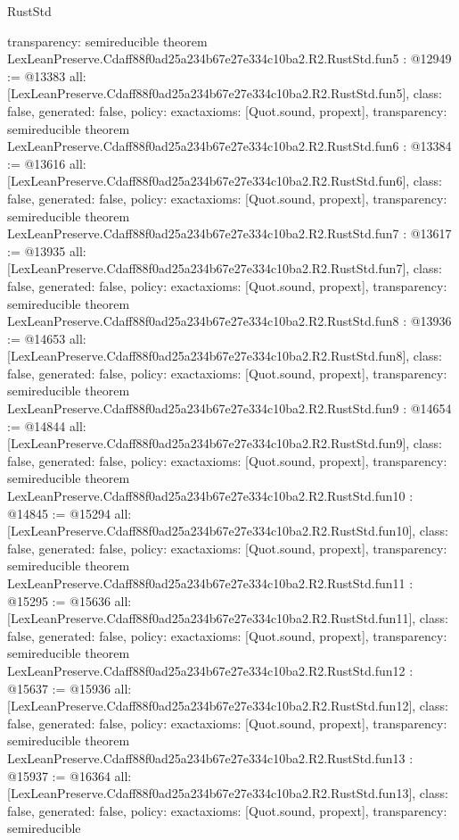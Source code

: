 \begin{lexlean}{RustStd}
\begin{coremodule}
{  transparency: semireducible
}
theorem LexLeanPreserve.Cdaff88f0ad25a234b67e27e334c10ba2.R2.RustStd.fun5 : @12949 := @13383 {
  all: [LexLeanPreserve.Cdaff88f0ad25a234b67e27e334c10ba2.R2.RustStd.fun5],
  class: false,
  generated: false,
  policy: exact{axioms: [Quot.sound, propext]},
  transparency: semireducible
}
theorem LexLeanPreserve.Cdaff88f0ad25a234b67e27e334c10ba2.R2.RustStd.fun6 : @13384 := @13616 {
  all: [LexLeanPreserve.Cdaff88f0ad25a234b67e27e334c10ba2.R2.RustStd.fun6],
  class: false,
  generated: false,
  policy: exact{axioms: [Quot.sound, propext]},
  transparency: semireducible
}
theorem LexLeanPreserve.Cdaff88f0ad25a234b67e27e334c10ba2.R2.RustStd.fun7 : @13617 := @13935 {
  all: [LexLeanPreserve.Cdaff88f0ad25a234b67e27e334c10ba2.R2.RustStd.fun7],
  class: false,
  generated: false,
  policy: exact{axioms: [Quot.sound, propext]},
  transparency: semireducible
}
theorem LexLeanPreserve.Cdaff88f0ad25a234b67e27e334c10ba2.R2.RustStd.fun8 : @13936 := @14653 {
  all: [LexLeanPreserve.Cdaff88f0ad25a234b67e27e334c10ba2.R2.RustStd.fun8],
  class: false,
  generated: false,
  policy: exact{axioms: [Quot.sound, propext]},
  transparency: semireducible
}
theorem LexLeanPreserve.Cdaff88f0ad25a234b67e27e334c10ba2.R2.RustStd.fun9 : @14654 := @14844 {
  all: [LexLeanPreserve.Cdaff88f0ad25a234b67e27e334c10ba2.R2.RustStd.fun9],
  class: false,
  generated: false,
  policy: exact{axioms: [Quot.sound, propext]},
  transparency: semireducible
}
theorem LexLeanPreserve.Cdaff88f0ad25a234b67e27e334c10ba2.R2.RustStd.fun10 : @14845 := @15294 {
  all: [LexLeanPreserve.Cdaff88f0ad25a234b67e27e334c10ba2.R2.RustStd.fun10],
  class: false,
  generated: false,
  policy: exact{axioms: [Quot.sound, propext]},
  transparency: semireducible
}
theorem LexLeanPreserve.Cdaff88f0ad25a234b67e27e334c10ba2.R2.RustStd.fun11 : @15295 := @15636 {
  all: [LexLeanPreserve.Cdaff88f0ad25a234b67e27e334c10ba2.R2.RustStd.fun11],
  class: false,
  generated: false,
  policy: exact{axioms: [Quot.sound, propext]},
  transparency: semireducible
}
theorem LexLeanPreserve.Cdaff88f0ad25a234b67e27e334c10ba2.R2.RustStd.fun12 : @15637 := @15936 {
  all: [LexLeanPreserve.Cdaff88f0ad25a234b67e27e334c10ba2.R2.RustStd.fun12],
  class: false,
  generated: false,
  policy: exact{axioms: [Quot.sound, propext]},
  transparency: semireducible
}
theorem LexLeanPreserve.Cdaff88f0ad25a234b67e27e334c10ba2.R2.RustStd.fun13 : @15937 := @16364 {
  all: [LexLeanPreserve.Cdaff88f0ad25a234b67e27e334c10ba2.R2.RustStd.fun13],
  class: false,
  generated: false,
  policy: exact{axioms: [Quot.sound, propext]},
  transparency: semireducible
}
\end{coremodule}
\end{lexlean}
